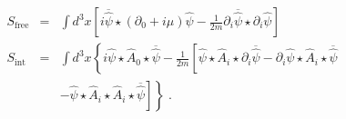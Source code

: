 \documentclass[a4paper,12pt]{article}
\begin{document}
\begin{eqnarray}
S_{\mathrm{free}} & = & \int d^3x \left[ i{\overline {\widehat \psi}} \star( \partial_0 +i \mu) 
{\widehat \psi} - 
\frac{1}{2m} \partial_i{\overline {\widehat \psi}} \star \partial_i{\widehat \psi} 
\right] \nonumber\\
S_{\mathrm{int}} & = & \int d^3x \left\{i {\widehat \psi} \star {\widehat A}_0 \star 
{\overline {\widehat\psi}} -\frac{1}{2m} \left[ {\widehat \psi} \star {\widehat A_i} 
\star \partial_i  {\overline {\widehat\psi}} - \partial_i {\widehat \psi} 
\star {\widehat A}_i \star  {\overline {\widehat\psi}}
\right. \right. \nonumber \\ & & \left. \left .
-{\widehat \psi} \star {\widehat A}_i \star {\widehat A}_i 
\star {\overline {\widehat\psi}} \right] \right\} \;.
\end{eqnarray}
\end{document}

